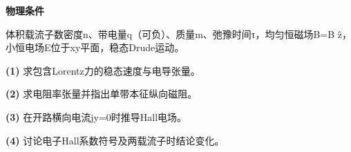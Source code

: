 \textbf{物理条件}\par 体积载流子数密度n、带电量q（可负）、质量m、弛豫时间τ，均匀恒磁场B=B ẑ，小恒电场E位于xy平面，稳态Drude运动。
\par\noindent\textbf{(1)} 求包含Lorentz力的稳态速度与电导张量。
\par\noindent\textbf{(2)} 求电阻率张量并指出单带本征纵向磁阻。
\par\noindent\textbf{(3)} 在开路横向电流jy=0时推导Hall电场。
\par\noindent\textbf{(4)} 讨论电子Hall系数符号及两载流子时结论变化。
